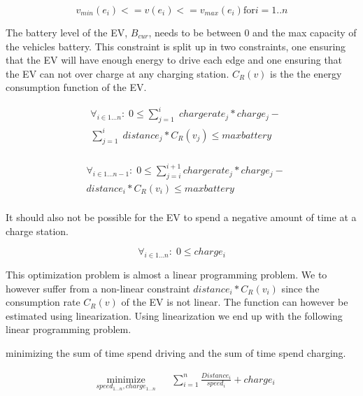 \begin{equation}
v_{min}(e_i) <= v(e_i) <= v_{max}(e_i) \text{for} i = 1..n  
\end{equation}

The battery level of the EV, $B_{cur}$, needs to be between $0$ and the max capacity of the vehicles battery. This constraint is split up in two constraints, one ensuring that the EV will have enough energy to drive each edge and one ensuring that the EV can not over charge at any charging station. $C_R(v)$ is the the energy consumption function of the EV.

\begin{equation}
\begin{aligned}
& \forall_{i \in 1 \dots n}: \; 0 \leq \sum_{j=1}^{i} \; chargerate_j*charge_j - \\
&  \sum_{j=1}^{i} \; distance_j*C_R(v_j) \leq maxbattery \\
 \end{aligned}
\end{equation}

\begin{equation}
\begin{aligned}
& \forall_{i \in 1 \dots n-1}: \; 0 \leq \sum_{j=i}^{i+1} chargerate_j*charge_j - \\
&   distance_i*C_R(v_i) \leq maxbattery \\
 \end{aligned}
\end{equation}

It should also not be possible for the EV to spend a negative amount of time at a charge station.

\begin{equation}
\forall_{i \in 1 \dots n}: \; 0 \leq charge_i 
\end{equation}

This optimization problem is almost a linear programming problem. We to however suffer from a non-linear constraint $distance_i*C_R(v_i)$ since the consumption rate $C_R(v)$ of the EV is not linear. The function can however be estimated using linearization. Using linearization we end up with the following linear programming problem.  
 
minimizing the sum of time spend driving and the sum of time spend charging. 

\begin{equation}
\begin{aligned}
 & \underset{speed_{1 \dots n},charge_{1 \dots n}}
{\text{minimize}}
& & \sum_{i=1}^{n} \frac{Distance_i}{speed_i} + charge_i \\
\end{aligned}
\end{equation}\label{eq:objfunction}

